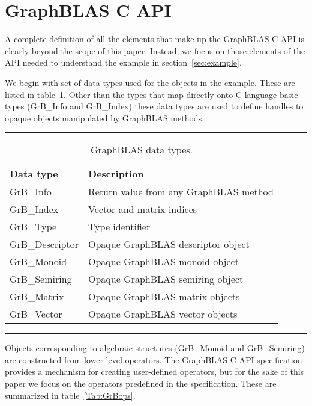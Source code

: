 \section{GraphBLAS C API}
\label{sec:Capi}

A complete definition of all the elements that make up the GraphBLAS C API
is clearly beyond the scope of this paper.  Instead, we focus on those
elements of the API needed to understand the example in section~\ref{sec:example}. 

We begin with set of data types used for the objects in the example.
These are listed in table~\ref{Tab:GrBdataTypes}.  Other than the types that map directly onto
C language basic types ({\sf GrB\_Info} and {GrB\_Index}) these data types
are used to define handles to opaque objects manipulated by GraphBLAS methods.
\begin{table}[h]
\hrule
\begin{center}
\caption{GraphBLAS data types.}
\label{Tab:GrBdataTypes}
\begin{tabular}{lp{5.25cm}}
Data type                     & Description  \\
\hline
	{\sf GrB\_Info}           & Return value from any GraphBLAS method \\
	{\sf GrB\_Index}          & Vector and matrix indices \\
	{\sf GrB\_Type}		      & Type identifier \\
	{\sf GrB\_Descriptor}     & Opaque GraphBLAS descriptor object \\
	{\sf GrB\_Monoid}         & Opaque GraphBLAS monoid object  \\
	{\sf GrB\_Semiring}       & Opaque GraphBLAS semiring object  \\
	{\sf GrB\_Matrix}         & Opaque GraphBLAS matrix objects \\
	{\sf GrB\_Vector}         & Opaque GraphBLAS vector objects \\
\end{tabular}
\end{center}
\hrule
\end{table}
Objects corresponding to algebraic structures ({\sf GrB\_Monoid} and {\sf GrB\_Semiring}) are constructed from lower level
operators. The GraphBLAS C API specification provides a mechanism for creating user-defined operators, but for the 
sake of this paper we focus on the operators predefined in the specification.  These are summarized
in table~\ref{Tab:GrBops}. 
